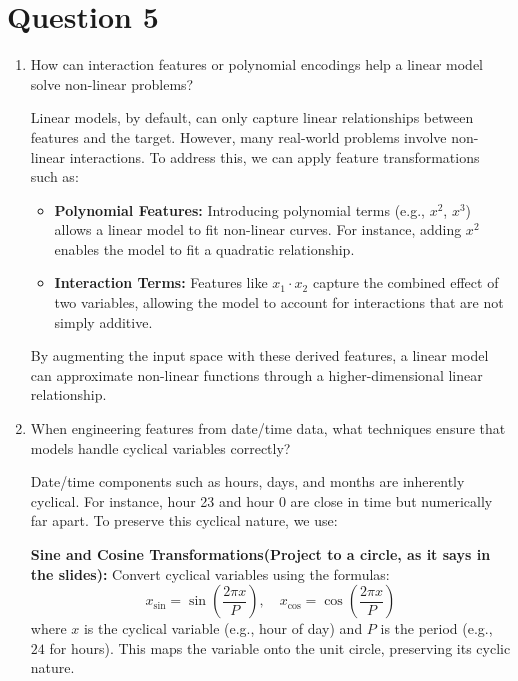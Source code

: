 \documentclass[a4paper,12pt]{article}
\begin{document}
\section*{Question 5}
\begin{enumerate}[label=(\alph*)]
    \item How can interaction features or polynomial encodings help a linear model solve non-linear problems?

    Linear models, by default, can only capture linear relationships between features and the target. However, many real-world problems involve non-linear interactions. To address this, we can apply feature transformations such as:

    \begin{itemize}
        \item \textbf{Polynomial Features:} Introducing polynomial terms (e.g., $x^2$, $x^3$) allows a linear model to fit non-linear curves. For instance, adding $x^2$ enables the model to fit a quadratic relationship.
        
        \item \textbf{Interaction Terms:} Features like $x_1 \cdot x_2$ capture the combined effect of two variables, allowing the model to account for interactions that are not simply additive.
    \end{itemize}

    By augmenting the input space with these derived features, a linear model can approximate non-linear functions through a higher-dimensional linear relationship.

    \item When engineering features from date/time data, what techniques ensure that models handle cyclical variables correctly?

    Date/time components such as hours, days, and months are inherently cyclical. For instance, hour 23 and hour 0 are close in time but numerically far apart. To preserve this cyclical nature, we use:

    \textbf{Sine and Cosine Transformations(Project to a circle, as it says in the slides):} Convert cyclical variables using the formulas:
    \[
    x_{\sin} = \sin\left(\frac{2\pi x}{P}\right), \quad x_{\cos} = \cos\left(\frac{2\pi x}{P}\right)
    \]
    where $x$ is the cyclical variable (e.g., hour of day) and $P$ is the period (e.g., $24$ for hours). This maps the variable onto the unit circle, preserving its cyclic nature.
\end{enumerate}
\end{document}
